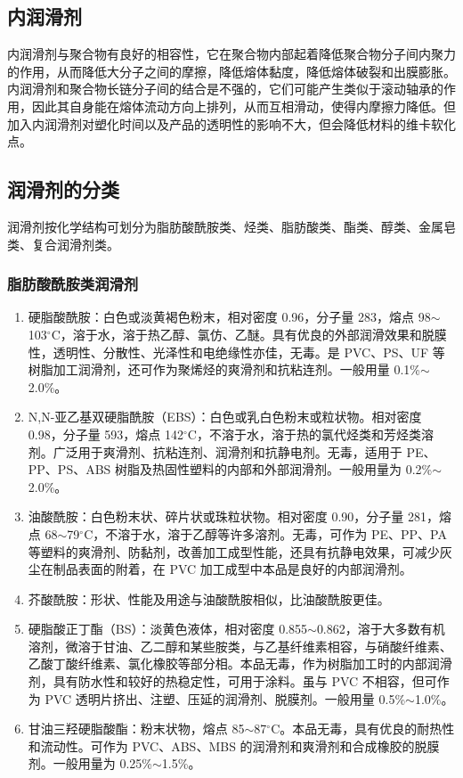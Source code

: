 \documentclass[a4paper, oneside, onecolumn, 12pt]{ctexrep}    %
\newcommand{\cd}{$^{\circ}$C}  %
\begin{document}
\subsection{内润滑剂}
内润滑剂与聚合物有良好的相容性，它在聚合物内部起着降低聚合物分子间内聚力的作用，从而降低大分子之间的摩擦，降低熔体黏度，降低熔体破裂和出膜膨胀。内润滑剂和聚合物长链分子间的结合是不强的，它们可能产生类似于滚动轴承的作用，因此其自身能在熔体流动方向上排列，从而互相滑动，使得内摩擦力降低。但加入内润滑剂对塑化时间以及产品的透明性的影响不大，但会降低材料的维卡软化点。

\subsection{润滑剂的分类}
润滑剂按化学结构可划分为脂肪酸酰胺类、烃类、脂肪酸类、酯类、醇类、金属皂类、复合润滑剂类。

\subsubsection{脂肪酸酰胺类润滑剂}

\begin{enumerate}
    \item[\ding{192}] 硬脂酸酰胺：白色或淡黄褐色粉末，相对密度 0.96，分子量 283，熔点 98$\sim$103\cd，溶于水，溶于热乙醇、氯仿、乙醚。具有优良的外部润滑效果和脱膜性，透明性、分散性、光泽性和电绝缘性亦佳，无毒。是 PVC、PS、UF 等树脂加工润滑剂，还可作为聚烯烃的爽滑剂和抗粘连剂。一般用量 0.1\%$\sim$2.0\%。
    \item[\ding{193}] N,N-亚乙基双硬脂酰胺（EBS）：白色或乳白色粉末或粒状物。相对密度 0.98，分子量 593，熔点 142\cd，不溶于水，溶于热的氯代烃类和芳烃类溶剂。广泛用于爽滑剂、抗粘连剂、润滑剂和抗静电剂。无毒，适用于 PE、PP、PS、ABS 树脂及热固性塑料的内部和外部润滑剂。一般用量为 0.2\%$\sim$2.0\%。
    \item[\ding{194}] 油酸酰胺：白色粉末状、碎片状或珠粒状物。相对密度 0.90，分子量 281，熔点 68$\sim$79\cd，不溶于水，溶于乙醇等许多溶剂。无毒，可作为 PE、PP、PA 等塑料的爽滑剂、防黏剂，改善加工成型性能，还具有抗静电效果，可减少灰尘在制品表面的附着，在 PVC 加工成型中本品是良好的内部润滑剂。
    \item[\ding{195}] 芥酸酰胺：形状、性能及用途与油酸酰胺相似，比油酸酰胺更佳。
    \item[\ding{196}] 硬脂酸正丁酯（BS）：淡黄色液体，相对密度 0.855$\sim$0.862，溶于大多数有机溶剂，微溶于甘油、乙二醇和某些胺类，与乙基纤维素相容，与硝酸纤维素、乙酸丁酸纤维素、氯化橡胶等部分相。本品无毒，作为树脂加工时的内部润滑剂，具有防水性和较好的热稳定性，可用于涂料。虽与 PVC 不相容，但可作为 PVC 透明片挤出、注塑、压延的润滑剂、脱膜剂。一般用量 0.5\%$\sim$1.0\%。
    \item[\ding{197}] 甘油三羟硬脂酸酯：粉末状物，熔点 85$\sim$87\cd。本品无毒，具有优良的耐热性和流动性。可作为 PVC、ABS、MBS 的润滑剂和爽滑剂和合成橡胶的脱膜剂。一般用量为 0.25\%$\sim$1.5\%。
\end{enumerate}
\end{document}
